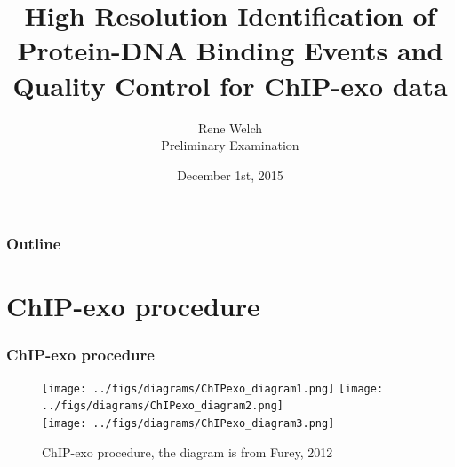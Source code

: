 \documentclass[table,xcolor=dvipsnames]{beamer}\usepackage[]{graphicx}\usepackage[]{color}
\title[High Resolution Identification of Protein-DNA Binding Events]{High Resolution Identification of Protein-DNA Binding Events
  and Quality Control for ChIP-exo data}
\author{Rene Welch\\Preliminary Examination}
\institute[UW-STAT]{Department of Statistics\\University of Wisconsin - Madison}
\date{December 1st, 2015}
\begin{document}
\begin{frame}
  \maketitle
\end{frame}

\begin{frame}
\frametitle{Outline}
  \tableofcontents
\end{frame}

\section{ChIP-exo procedure}

\begin{frame}
\frametitle{ChIP-exo procedure}
  \begin{figure}[H]
    \centering
\texttt{[image: ../figs/diagrams/ChIPexo\_diagram1.png]}
\texttt{[image: ../figs/diagrams/ChIPexo\_diagram2.png]}\\
\texttt{[image: ../figs/diagrams/ChIPexo\_diagram3.png]}
    \caption{ChIP-exo procedure, the diagram is from Furey, 2012 \cite{chipbeyond}}
    \label{fig:exo_diagram}
  \end{figure}
\end{frame}
\end{document}

